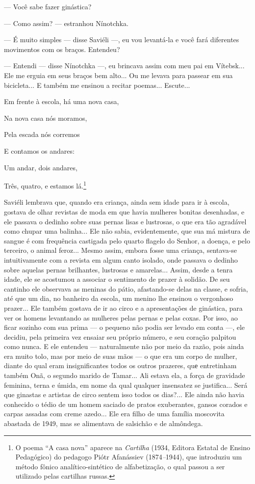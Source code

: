 --- Você sabe fazer ginástica?

--- Como assim? --- estranhou Nínotchka.

--- É muito simples --- disse Saviéli ---, eu vou levantá-la e você fará
diferentes movimentos com os braços. Entendeu?

--- Entendi --- disse Nínotchka ---, eu brincava assim com meu pai em
Vítebsk... Ele me erguia em seus braços bem alto... Ou me levava para
passear em sua bicicleta... E também me ensinou a recitar poemas...
Escute...

Em frente à escola, há uma nova casa,

Na nova casa nós moramos,

Pela escada nós corremos

E contamos os andares:

Um andar, dois andares,

Três, quatro, e estamos lá.\footnote{O poema ``A casa nova'' aparece na
  \emph{Cartilha} (1934, Editora Estatal de Ensino Pedagógico) do
  pedagogo Piótr Afanássiev (1874\emph{--}1944), que introduziu um
  método fônico analítico-sintético de alfabetização, o qual passou a
  ser utilizado pelas cartilhas russas.}

Saviéli lembrava que, quando era criança, ainda sem idade para ir à
escola, gostava de olhar revistas de moda em que havia mulheres bonitas
desenhadas, e ele passava o dedinho sobre suas pernas lisas e lustrosas,
o que era tão agradável como chupar uma balinha... Ele não sabia,
evidentemente, que sua má mistura de sangue é com frequência castigada
pelo quarto flagelo do Senhor, a doença, e pelo terceiro, o animal
feroz... Mesmo assim, embora fosse uma criança, sentava-se
intuitivamente com a revista em algum canto isolado, onde passava o
dedinho sobre aquelas pernas brilhantes, lustrosas e amarelas... Assim,
desde a tenra idade, ele se acostumou a associar o sentimento de prazer
à solidão. De seu cantinho ele observava as meninas do pátio,
afastando-se delas na classe, e sofria, até que um dia, no banheiro da
escola, um menino lhe ensinou o vergonhoso prazer... Ele também gostava
de ir ao circo e a apresentações de ginástica, para ver os homens
levantando as mulheres pelas pernas e pelas coxas. Por isso, ao ficar
sozinho com sua prima --- o pequeno não podia ser levado em conta ---,
ele decidiu, pela primeira vez ensaiar seu próprio número, e seu coração
palpitou como nunca. E ele entendeu --- naturalmente não por meio da
razão, pois ainda era muito tolo, mas por meio de suas mãos --- o que
era um corpo de mulher, diante do qual eram insignificantes todos os
outros prazeres, quе entretinham também Onã, o segundo marido de
Tamar... Ali estava ela, a força de gravidade feminina, terna e úmida,
em nome da qual qualquer insensatez se justifica... Será que ginastas e
artistas de circo sentem isso todos os dias?... Ele ainda não havia
conhecido o tédio de um homem saciado de pratos exuberantes, gansos
corados e carpas assadas com creme azedo... Ele era filho de uma família
moscovita abastada de 1949, mas se alimentava de salsichão e de
almôndega.

